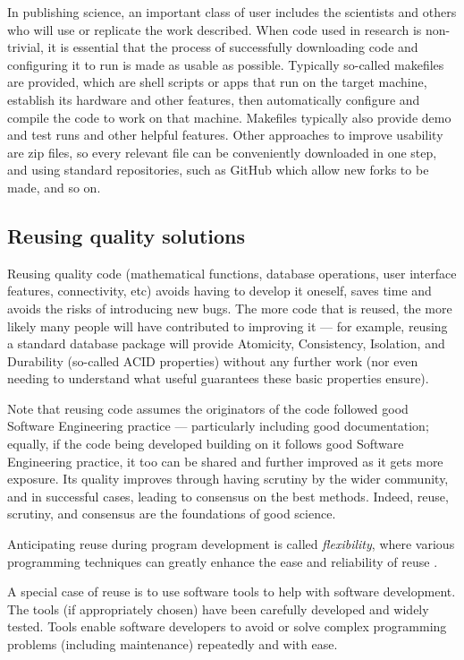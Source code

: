 \documentclass[10pt,a4paper]{article}
\begin{document}
{In publishing science, an important class of user includes the scientists and others who will use or replicate the work described. When code used in research is non-trivial, it is essential that the process of successfully downloading code and configuring it to run is made as usable as possible. Typically so-called makefiles are provided, which are shell scripts or apps that run on the target machine, establish its hardware and other features, then automatically configure and compile the code to work on that machine. Makefiles typically also provide demo and test runs and other helpful features. Other approaches to improve usability are zip files, so every relevant file can be conveniently downloaded in one step, and using standard repositories, such as GitHub which allow new forks to be made, and so on.}

\subsection{Reusing quality solutions}
Reusing quality code (mathematical functions, database operations, user interface features, connectivity, etc) avoids having to develop it oneself, saves time and avoids the risks of introducing new bugs. The more code that is reused, the more likely many people will have contributed to improving it --- for example, reusing a standard database package will provide Atomicity, Consistency, Isolation, and Durability (so-called ACID properties) without any further work (nor even needing to understand what useful guarantees these basic properties ensure). 

Note that reusing code assumes the originators of the code followed good Software Engineering practice --- particularly including good documentation; equally, if the code being developed building on it follows good Software Engineering practice, it too can be shared and further improved as it gets more exposure. Its quality improves through having scrutiny by the wider community, and in successful cases, leading to consensus on the best methods. Indeed, reuse, scrutiny, and consensus are the foundations of good science.

Anticipating reuse during program development is called \emph{flexibility}, where various programming techniques can greatly enhance the ease and reliability of reuse \cite{flexibility}.

A special case of reuse is to use software tools to help with software development. The tools (if appropriately chosen) have been carefully developed and widely tested. Tools enable software developers to avoid or solve complex programming problems (including maintenance) repeatedly and with ease.
\end{document}
